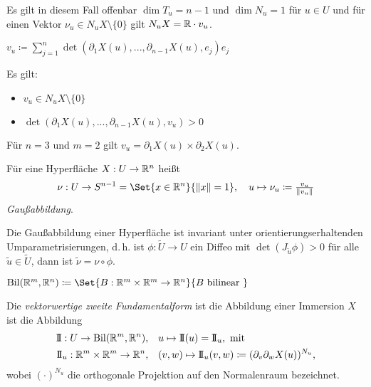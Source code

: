 \documentclass{cheat-sheet}
\newcommand{\Bil}{\mathrm{Bil}}
\newcommand{\II}{\mathrm{I\!I}}
\let\mySum\sum
\DeclareMathOperator*{\textsum}{{\textstyle \mySum}}
\renewcommand{\sum}{\textsum\limits}
\begin{document}
\begin{bem}
  Es gilt in diesem Fall offenbar $\dim T_u = n - 1$ und $\dim N_u = 1$ für $u \in U$ und für einen Vektor $\nu_u \in N_u X \setminus \{ 0 \}$ gilt $N_u X = \mathbb{R} \cdot v_u$.
\end{bem}

\begin{defn}
  $v_u \coloneqq \sum_{j=1}^{n} \det(\partial_1 X(u), ..., \partial_{n-1} X(u), e_j) e_j$
\end{defn}

\begin{bem}
  Es gilt:
  \begin{itemize}
    \item $v_u \in N_u X \setminus \{ 0 \}$
    \item $\det(\partial_1 X(u), ..., \partial_{n-1} X(u), v_u) > 0$
  \end{itemize}
\end{bem}

\begin{bem}
  Für $n = 3$ und $m = 2$ gilt $v_u = \partial_1 X(u) \times \partial_2 X(u)$.
\end{bem}

\begin{defn}
  Für eine Hyperfläche $X : U \to \mathbb{R}^n$ heißt
  \[ \nu : U \to S^{n-1} = \Set{ x \in \R^n }{ \| x \| = 1 }, \quad u \mapsto \nu_u \coloneqq \tfrac{v_u}{\| v_u \|} \]
  \emph{Gaußabbildung}.
\end{defn}

\begin{satz}
  Die Gaußabbildung einer Hyperfläche ist invariant unter orientierungserhaltenden Umparametrisierungen, d.\,h. ist $\phi : \tilde{U} \to U$ ein Diffeo mit $\det(J_{\tilde{u}} \phi) > 0$ für alle $\tilde{u} \in \tilde{U}$, dann ist $\tilde{\nu} = \nu \circ \phi$.
\end{satz}

\begin{nota}
  $\Bil(\R^m, \R^n) \coloneqq \Set{ B : \R^m \times \R^m \to \R^n }{ B \text{ bilinear } }$
\end{nota}

\begin{defn}
  Die \emph{vektorwertige zweite Fundamentalform} ist die Abbildung einer Immersion $X$ ist die Abbildung
  \begin{align*}
    \II : U \to \Bil(\R^m, \R^n), \quad & u \mapsto \II(u) = \II_u, \text { mit } \\
    \II_u : \R^m \times \R^m \to \R^n, \quad & (v, w) \mapsto \II_u(v, w) \coloneqq (\partial_v \partial_w X(u))^{N_u},
  \end{align*}
  wobei $(\cdot)^{N_u}$ die orthogonale Projektion auf den Normalenraum bezeichnet.
\end{defn}
\end{document}
